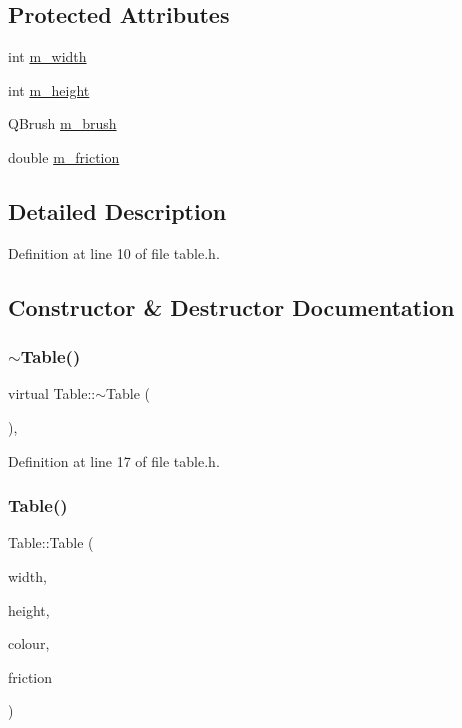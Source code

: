 \subsection*{Protected Attributes}
\begin{DoxyCompactItemize}
\item 
int \mbox{\hyperlink{class_table_a1e99922a6f86bbbe649c4705590b3409}{m\+\_\+width}}
\item 
int \mbox{\hyperlink{class_table_af1f22da42093769f53dcc3ebe7ea40c0}{m\+\_\+height}}
\item 
Q\+Brush \mbox{\hyperlink{class_table_a9c8db37610dfe62b570c7a386db69939}{m\+\_\+brush}}
\item 
double \mbox{\hyperlink{class_table_aa26465bb9074d6f07dec1a41a06a7d62}{m\+\_\+friction}}
\end{DoxyCompactItemize}


\subsection{Detailed Description}


Definition at line 10 of file table.\+h.



\subsection{Constructor \& Destructor Documentation}
\mbox{\label{class_table_ac7541d139723d710fb7c39b1898d6e87}} 
\subsubsection{\texorpdfstring{$\sim$\+Table()}{~Table()}}
{\footnotesize\ttfamily virtual Table\+::$\sim$\+Table (\begin{DoxyParamCaption}{ }\end{DoxyParamCaption})\hspace{0.3cm}{\ttfamily [inline]}, {\ttfamily [virtual]}}



Definition at line 17 of file table.\+h.

\mbox{\label{class_table_a7f7c9dbfd3a6ebf5360cfd30e6d9ceb6}} 
\subsubsection{\texorpdfstring{Table()}{Table()}}
{\footnotesize\ttfamily Table\+::\+Table (\begin{DoxyParamCaption}\item[{int}]{width,  }\item[{int}]{height,  }\item[{Q\+Color}]{colour,  }\item[{double}]{friction }\end{DoxyParamCaption})\hspace{0.3cm}{\ttfamily [inline]}}



